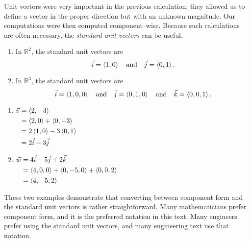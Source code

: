 Unit vectors were very important in the previous calculation; they allowed us to define a vector in the proper direction but with an unknown magnitude. Our computations were then computed component--wise. Because such calculations are often necessary, the \textit{standard unit vectors} can be useful.

{\begin{enumerate}
	\item In $\mathbb{R}^2$, the standard unit vectors are
	$$\vec i = \left\langle 1,0\right\rangle \quad \text{and}\quad \vec j = \left\langle 0,1\right\rangle.$$
	\item In $\mathbb{R}^3$, the standard unit vectors are
	$$\vec i = \left\langle 1,0,0\right\rangle \quad \text{and}\quad \vec j = \left\langle 0,1,0\right\rangle \quad \text{and}\quad \vec k = \left\langle 0,0,1\right\rangle.$$
\end{enumerate}
}

{\begin{enumerate}
	\item  \hfill$\displaystyle \begin{aligned}[t]
					\vec v &= \left\langle 2,-3\right\rangle \\
								&= \left\langle 2,0\right\rangle + \left\langle 0,-3\right\rangle \\
								&= 2\left\langle 1,0\right\rangle -3\left\langle 0,1\right\rangle\\
								&= 2\vec i - 3\vec j
				\end{aligned}$\hfill\null
	
	\item	\hfill $\displaystyle \begin{aligned}[t]
				\vec w &= 4\vec i - 5\vec j +2\vec k\\
							&= \left\langle 4,0,0\right\rangle +\left\langle 0,-5,0\right\rangle + \left\langle 0,0,2\right\rangle \\
							&= \left\langle 4,-5,2\right\rangle
							\end{aligned}$\hfill\null
\end{enumerate}
These two examples demonstrate that converting between component form and the standard unit vectors is rather straightforward. Many mathematicians prefer component form, and it is the preferred notation in this text. Many engineers prefer using the standard unit vectors, and many engineering text use that notation.
}\\

